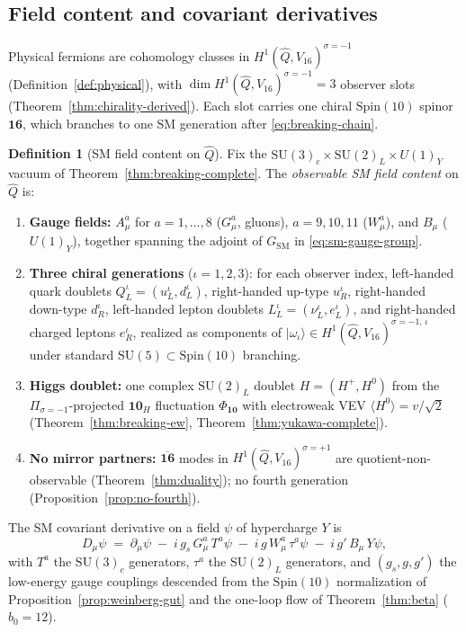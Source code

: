 \documentclass[11pt]{article}
\theoremstyle{plain}
\theoremstyle{definition}
\newtheorem{definition}[theorem]{Definition}
\theoremstyle{remark}
\numberwithin{equation}{section}
\newcommand{\Spin}{\mathrm{Spin}}
\begin{document}
\subsection{Field content and covariant derivatives}
\label{sec:sm-lagrangian:fields}

Physical fermions are cohomology classes in
$H^1(\hat Q,V_{16})^{\sigma=-1}$ (Definition~\ref{def:physical}), with
$\dim H^1(\hat Q,V_{16})^{\sigma=-1}=3$ observer slots
(Theorem~\ref{thm:chirality-derived}). Each slot carries one chiral
$\Spin(10)$ spinor $\mathbf{16}$, which branches to one SM generation after
\eqref{eq:breaking-chain}.

\begin{definition}[SM field content on $\hat Q$]\label{def:sm-fields}
Fix the $\mathrm{SU}(3)_c\times\mathrm{SU}(2)_L\times U(1)_Y$ vacuum of
Theorem~\ref{thm:breaking-complete}. The \emph{observable SM field content}
on $\hat Q$ is:
\begin{enumerate}[label=\textbf{(\arabic*)},leftmargin=*]
  \item \textbf{Gauge fields:} $A_\mu^a$ for $a=1,\ldots,8$ ($G_\mu^a$, gluons),
    $a=9,10,11$ ($W_\mu^a$), and $B_\mu$ ($U(1)_Y$), together spanning the
    adjoint of $G_{\mathrm{SM}}$ in \eqref{eq:sm-gauge-group}.
  \item \textbf{Three chiral generations} ($\iota=1,2,3$): for each observer
    index, left-handed quark doublets $Q_L^\iota=(u_L^\iota,d_L^\iota)$,
    right-handed up-type $u_R^\iota$, right-handed down-type $d_R^\iota$,
    left-handed lepton doublets $L_L^\iota=(\nu_L^\iota,e_L^\iota)$, and
    right-handed charged leptons $e_R^\iota$, realized as components of
    $|\omega_\iota\rangle\in H^1(\hat Q,V_{16})^{\sigma=-1,\,\iota}$
    under standard $\mathrm{SU}(5)\subset\Spin(10)$ branching.
  \item \textbf{Higgs doublet:} one complex $\mathrm{SU}(2)_L$ doublet
    $H=(H^+,H^0)$ from the $\Pi_{\sigma=-1}$-projected $\mathbf{10}_H$
    fluctuation $\Phi_{\mathbf{10}}$ with electroweak VEV
    $\langle H^0\rangle=v/\sqrt{2}$ (Theorem~\ref{thm:breaking-ew},
    Theorem~\ref{thm:yukawa-complete}).
  \item \textbf{No mirror partners:} $\overline{\mathbf{16}}$ modes in
    $H^1(\hat Q,V_{16})^{\sigma=+1}$ are quotient-non-observable
    (Theorem~\ref{thm:duality}); no fourth generation
    (Proposition~\ref{prop:no-fourth}).
\end{enumerate}
The SM covariant derivative on a field $\psi$ of hypercharge $Y$ is
\begin{equation}\label{eq:sm-covariant}
  D_\mu\psi
  \;=\;
  \partial_\mu\psi
  \;-\;
  i\,g_s\,G_\mu^a\,T^a\psi
  \;-\;
  i\,g\,W_\mu^a\,\tau^a\psi
  \;-\;
  i\,g'\,B_\mu\,Y\psi,
\end{equation}
with $T^a$ the $\mathrm{SU}(3)_c$ generators, $\tau^a$ the $\mathrm{SU}(2)_L$
generators, and $(g_s,g,g')$ the low-energy gauge couplings descended from the
$\Spin(10)$ normalization of Proposition~\ref{prop:weinberg-gut} and the
one-loop flow of Theorem~\ref{thm:beta} ($b_0=12$).
\end{definition}
\end{document}
